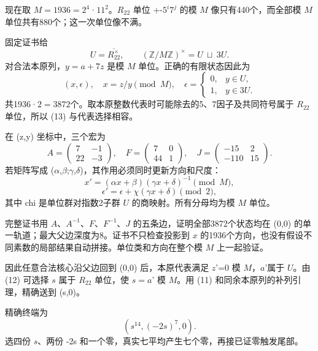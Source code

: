 {现在取} {\ensuremath{M=1936=2^{4}}·\ensuremath{11^{2}}。\ensuremath{R_{22}}} {单位} {+-\ensuremath{5^{i}7^{j}}} {的模} {\ensuremath{M}} {像只有440个，而全部模} {\ensuremath{M}} {单位共有880个；这一次单位像不满。}

{固定证书给} \[
U=\overline{R_{22}^{\times}},\qquad
(\mathbb Z/M\mathbb Z)^\times=U\ \sqcup\ 3U.
\tag{C31.12}
\] {对合法本原列，\ensuremath{y=a+7z}} {是模} {\ensuremath{M}} {单位。正确的有限状态因此为} \[
\boxed{(x,\epsilon),\quad x=z/y\pmod M,\quad
\epsilon=
\begin{cases}
0,&y\in U,\\
1,&y\in3U.
\end{cases}}
\tag{C31.13}
\] {共1936·\ensuremath{2=3872}个。取本原整数代表时可能除去的5、7因子及共同符号属于} {\ensuremath{R_{22}}} {单位，所以} {(13)} {与代表选择相容。}

{在} {(z,y)} {坐标中，三个宏为} \[
A=\begin{pmatrix}7&-1\\22&-3\end{pmatrix},\quad
F=\begin{pmatrix}7&0\\44&1\end{pmatrix},\quad
J=\begin{pmatrix}-15&2\\-110&15\end{pmatrix}.
\tag{C31.14}
\] {若矩阵写成} {(}\ensuremath{\alpha}{,}\ensuremath{\beta}{;}\ensuremath{\gamma}{,}\ensuremath{\delta}{)，其作用必须同时更新方向和尺度：} \[
x'=(\alpha x+\beta)(\gamma x+\delta)^{-1}\pmod M,
\] \[
\epsilon'=\epsilon+\chi(\gamma x+\delta)\pmod2,
\tag{C31.15}
\] {其中} {chi} {是单位群对指数2子群} {\ensuremath{U}} {的商映射。所有分母均为模} {\ensuremath{M}} {单位。}

{完整证书用} {\ensuremath{A}、\ensuremath{A^{-1}}、\ensuremath{F}、\ensuremath{F^{-1}}、\ensuremath{J}} {的五条边，证明全部3872个状态均在} {(0,0)} {的单一轨道；最大父边深度为8。证书不只检查投影到} {\ensuremath{x}} {的1936个方向，也没有假设不同素数的局部结果自动拼接。单位类和方向在整个模} {\ensuremath{M}} {上一起验证。}

{因此任意合法核心沿父边回到} {(0,0)} {后，本原代表满足} {\ensuremath{z}'=0} {模} {\ensuremath{M}，\ensuremath{a}'属于} {\ensuremath{U}。由} {(12)} {可选择} {\ensuremath{s}} {属于} {\ensuremath{R_{22}}} {单位，使} {\ensuremath{s=a}'} {模} {\ensuremath{M}。用} {(11)} {和同余本原列的补列引理，精确送到} {(s,0)。}

{精确终端为} \[
(s^{14},(-2s)^7,0).
\] {选四份} {\ensuremath{s}、两份} {-2s} {和一个零，真实七平均产生七个零，再接已证零触发尾部。}

